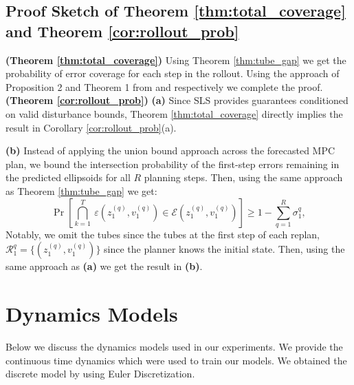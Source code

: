 \documentclass{l4dc2026}
\newenvironment{proofsketch}{%
  \renewcommand{\proofname}{Proof Sketch}\proof}{\endproof}
\begin{document}
\subsection{Proof Sketch of Theorem \ref{thm:total_coverage} and Theorem \ref{cor:rollout_prob}}
\begin{proofsketch} \textbf{(Theorem \ref{thm:total_coverage})}
Using Theorem \ref{thm:tube_gap} we get the probability of error coverage for each step in the rollout. Using the approach of Proposition 2 and Theorem 1 from \citet{DBLP:conf/l4dc/CheeSHP24} and \citet{DBLP:journals/ral/LindemannCSP23} respectively we complete the proof. 
\end{proofsketch}
\begin{proofsketch}\textbf{(Theorem \ref{cor:rollout_prob})}
\textbf{(a)} Since SLS provides guarantees conditioned on valid disturbance bounds, Theorem \ref{thm:total_coverage} directly implies the result in Corollary \ref{cor:rollout_prob}(a).

\textbf{(b)} Instead of applying the union bound approach across the forecasted MPC plan, we bound the intersection probability of the first-step errors remaining in the predicted ellipsoids for all $R$ planning steps. Then, using the same approach as Theorem \ref{thm:tube_gap} we get: 
\begin{equation}
        \Pr[\bigcap_{k=1}^{T}~\varepsilon(z_1^{(q)}, v_1^{(q)}) \in \mathcal{E}(z_1^{(q)}, v_1^{(q)})] \geq 1- \sum_{q=1}^{R}\sigma_1^q,
\end{equation}
Notably, we omit the tubes since the tubes at the first step of each replan, $\mathcal{R}_1^{q} = \{(z_1^{(q)}, v_1^{(q)})\}$ since the planner knows the initial state. Then, using the same approach as \textbf{(a)} we get the result in \textbf{(b)}.  
\end{proofsketch}


\section{Dynamics Models}
Below we discuss the dynamics models used in our experiments. We provide the continuous time dynamics which were used to train our models. We obtained the discrete model by using Euler Discretization. 
\end{document}

